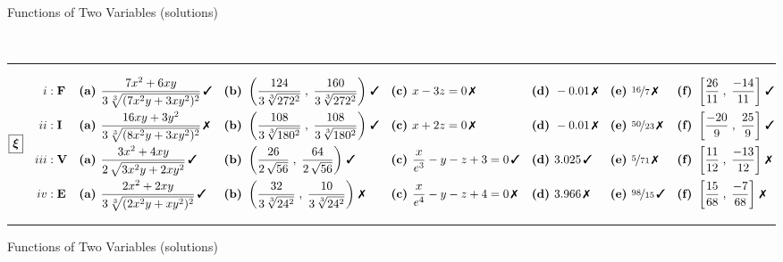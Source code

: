 \documentclass[10pt]{report}
\begin{document}
\begin{landscape}
\begin{center}{\huge \LARGE Functions of Two Variables (solutions)}
\begin{varwidth}{\linewidth}
\begin{center}
\\[2mm]
\rule[1mm]{\linewidth}{0.5pt}
$\boxed{\bm{\xi}} \quad \begin{aligned}
\romannumeral1 : \; &\textbf{F} 
 &&\mathrm{\textbf{(a) }} \frac{7x^2+6xy}{3\,\sqrt[3]{(7x^2y+3xy^2)^{2}}}\,\text{\ding{51}}
 &&\mathrm{\textbf{(b) }} \left( \frac{124}{3\,\sqrt[3]{272^2}} \;,\; \frac{160}{3\,\sqrt[3]{272^2}} \right)\,\text{\ding{51}}
 &&\mathrm{\textbf{(c) }} x-3z=0\,\text{\ding{55}}
 &&\mathrm{\textbf{(d) }} -0.01\,\text{\ding{55}}
 &&\mathrm{\textbf{(e) }} \nicefrac{16}{7}\,\text{\ding{55}}
 &&\mathrm{\textbf{(f) }} \left[\frac{26}{11}\;,\;\frac{-14}{11}\right]\,\text{\ding{51}}
\\[-0.4mm]
\romannumeral2 : \; &\textbf{I} 
 &&\mathrm{\textbf{(a) }} \frac{16xy+3y^2}{3\,\sqrt[3]{(8x^2y+3xy^2)^{2}}}\,\text{\ding{55}}
 &&\mathrm{\textbf{(b) }} \left( \frac{108}{3\,\sqrt[3]{180^2}} \;,\; \frac{108}{3\,\sqrt[3]{180^2}} \right)\,\text{\ding{51}}
 &&\mathrm{\textbf{(c) }} x+2z=0\,\text{\ding{55}}
 &&\mathrm{\textbf{(d) }} -0.01\,\text{\ding{55}}
 &&\mathrm{\textbf{(e) }} \nicefrac{50}{23}\,\text{\ding{55}}
 &&\mathrm{\textbf{(f) }} \left[\frac{-20}{9}\;,\;\frac{25}{9}\right]\,\text{\ding{51}}
\\[-0.4mm]
\romannumeral3 : \; &\textbf{V} 
 &&\mathrm{\textbf{(a) }} \frac{3x^2+4xy}{2\,\sqrt{3x^2y+2xy^2}}\,\text{\ding{51}}
 &&\mathrm{\textbf{(b) }} \left( \frac{26}{2\,\sqrt{56}} \;,\; \frac{64}{2\,\sqrt{56}} \right)\,\text{\ding{51}}
 &&\mathrm{\textbf{(c) }} \frac{x}{e^3} - y - z + 3 = 0\,\text{\ding{51}}
 &&\mathrm{\textbf{(d) }} 3.025\,\text{\ding{51}}
 &&\mathrm{\textbf{(e) }} \nicefrac{5}{71}\,\text{\ding{55}}
 &&\mathrm{\textbf{(f) }} \left[\frac{11}{12}\;,\;\frac{-13}{12}\right]\,\text{\ding{55}}
\\[-0.4mm]
\romannumeral4 : \; &\textbf{E} 
 &&\mathrm{\textbf{(a) }} \frac{2x^2+2xy}{3\,\sqrt[3]{(2x^2y+xy^2)^{2}}}\,\text{\ding{51}}
 &&\mathrm{\textbf{(b) }} \left( \frac{32}{3\,\sqrt[3]{24^2}} \;,\; \frac{10}{3\,\sqrt[3]{24^2}} \right)\,\text{\ding{55}}
 &&\mathrm{\textbf{(c) }} \frac{x}{e^4} - y - z + 4 = 0\,\text{\ding{55}}
 &&\mathrm{\textbf{(d) }} 3.966\,\text{\ding{55}}
 &&\mathrm{\textbf{(e) }} \nicefrac{98}{15}\,\text{\ding{51}}
 &&\mathrm{\textbf{(f) }} \left[\frac{15}{68}\;,\;\frac{-7}{68}\right]\,\text{\ding{55}}
\end{aligned} $
\\[2mm]
\rule[1mm]{\linewidth}{0.5pt}
\end{center}\end{varwidth}\end{center}\clearpage\begin{center}{\huge \LARGE Functions of Two Variables (solutions)}\\[4mm]\begin{varwidth}{\linewidth}\begin{center}

\end{center}
\end{varwidth}
\end{center}
\end{landscape}
\end{document}
